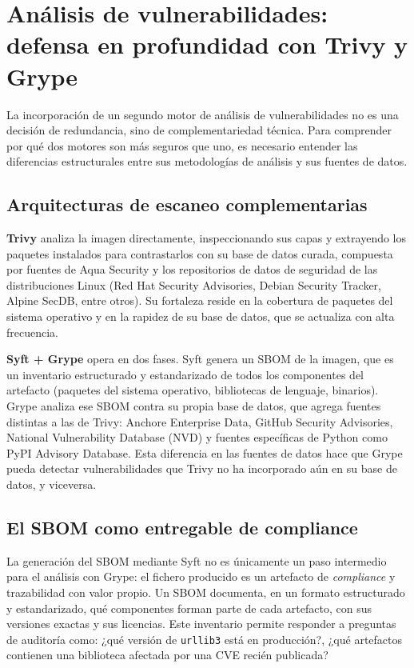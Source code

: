 \section{Análisis de vulnerabilidades: defensa en profundidad con Trivy y Grype}
\label{sec:vuln-analysis}

La incorporación de un segundo motor de análisis de vulnerabilidades no es una decisión de redundancia, sino de complementariedad técnica. Para comprender por qué dos motores son más seguros que uno, es necesario entender las diferencias estructurales entre sus metodologías de análisis y sus fuentes de datos.

\subsection{Arquitecturas de escaneo complementarias}

\textbf{Trivy} \cite{trivy_docs} analiza la imagen directamente, inspeccionando sus capas y extrayendo los paquetes instalados para contrastarlos con su base de datos curada, compuesta por fuentes de Aqua Security y los repositorios de datos de seguridad de las distribuciones Linux (Red Hat Security Advisories, Debian Security Tracker, Alpine SecDB, entre otros). Su fortaleza reside en la cobertura de paquetes del sistema operativo y en la rapidez de su base de datos, que se actualiza con alta frecuencia.

\textbf{Syft + Grype} opera en dos fases. Syft \cite{syft_docs} genera un SBOM de la imagen, que es un inventario estructurado y estandarizado de todos los componentes del artefacto (paquetes del sistema operativo, bibliotecas de lenguaje, binarios). Grype \cite{grype_docs} analiza ese SBOM contra su propia base de datos, que agrega fuentes distintas a las de Trivy: Anchore Enterprise Data, GitHub Security Advisories, National Vulnerability Database (NVD) y fuentes específicas de Python como PyPI Advisory Database. Esta diferencia en las fuentes de datos hace que Grype pueda detectar vulnerabilidades que Trivy no ha incorporado aún en su base de datos, y viceversa.

\subsection{El SBOM como entregable de compliance}

La generación del SBOM mediante Syft no es únicamente un paso intermedio para el análisis con Grype: el fichero producido es un artefacto de \textit{compliance} y trazabilidad con valor propio. Un SBOM documenta, en un formato estructurado y estandarizado, qué componentes forman parte de cada artefacto, con sus versiones exactas y sus licencias. Este inventario permite responder a preguntas de auditoría como: ¿qué versión de \texttt{urllib3} está en producción?, ¿qué artefactos contienen una biblioteca afectada por una CVE recién publicada?

